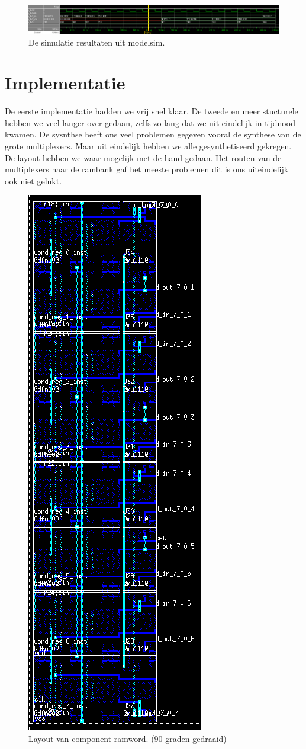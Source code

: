 \documentclass{scrartcl}  %
\begin{document}
\begin{figure}[H]
\centering
		\includegraphics[width=\textwidth]{resource/modelsimsim}
		\caption{De simulatie resultaten uit modelsim.}
		\label{fig:modelsim-ram}
\end{figure}

\section{Implementatie}
De eerste implementatie hadden we vrij snel klaar. De tweede en meer stucturele hebben we veel langer over gedaan, zelfs zo lang dat we uit eindelijk in tijdnood kwamen. De sysnthse heeft ons veel problemen gegeven vooral de synthese van de grote multiplexers. Maar uit eindelijk hebben we alle gesynthetiseerd gekregen. De layout hebben we waar mogelijk met de hand gedaan. Het routen van de multiplexers naar de rambank gaf het meeste problemen dit is ons uiteindelijk ook niet gelukt.
\begin{figure}[H]
\centering
		\includegraphics[height=\textwidth, angle=90]{resource/ramword}
		\caption{Layout van component ramword. (90 graden gedraaid)}
		\label{fig:layout-ramword}
\end{figure}
\end{document}
